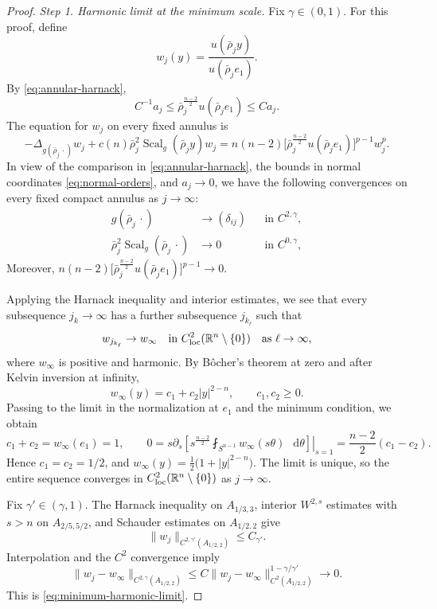 \documentclass[11pt]{article}
\numberwithin{equation}{section}
\theoremstyle{remark}
\newcommand{\R}{\mathbb R}
\newcommand{\Sph}{S}
\newcommand{\pa}{\partial}
\newcommand{\dd}{\mathop{}\!\mathrm{d}}
\begin{document}
\par
\begin{proof}
\emph{Step 1. Harmonic limit at the minimum scale.}
Fix \(\gamma\in(0,1)\).
{For this proof, define}
\[
 w_j(y)=\frac{u(\bar\rho_jy)}{u(\bar\rho_je_1)}.
\]
By \eqref{eq:annular-harnack},
\[
 C^{-1}a_j
 \le\bar\rho_j^{\frac{n-2}{2}}u(\bar\rho_je_1)
 \le Ca_j.
\]
The equation for \(w_j\) on every fixed annulus is
\[
 -\Delta_{g(\bar\rho_j\,\cdot)}w_j
 +c(n)\bar\rho_j^2\operatorname{Scal}_g(\bar\rho_jy)w_j
 =
 n(n-2)
 \bigl[\bar\rho_j^{\frac{n-2}{2}}u(\bar\rho_je_1)\bigr]^{p-1}w_j^p.
\]
{In view of the comparison in
\eqref{eq:annular-harnack}, the bounds in normal coordinates
\eqref{eq:normal-orders}, and \(a_j\to0\), we have the following
convergences on every fixed compact annulus as \(j\to\infty\):}
 {
\[
 \begin{aligned}
 g(\bar\rho_j\,\cdot)
 &\to(\delta_{ij})
 &&\text{in }C^{2,\gamma},\\
 \bar\rho_j^2\operatorname{Scal}_g(\bar\rho_j\,\cdot)
 &\to0
 &&\text{in }C^{0,\gamma},
 \end{aligned}
\]
}
Moreover, \(n(n-2)\bigl[\bar\rho_j^{\frac{n-2}{2}}u(\bar\rho_je_1)\bigr]^{p-1} \to 0\).

{Applying the Harnack inequality and interior estimates, we
see that every subsequence \(j_k\to\infty\) has a further subsequence
\(j_{k_\ell}\) such that}
\[
 w_{j_{k_\ell}}\to w_\infty
 \quad\text{in }C^2_{\rm loc}(\R^n\setminus\{0\})
 \quad\text{as }\ell\to\infty,
\]
where \(w_\infty\) is positive and harmonic.
{By B\^ocher's theorem at zero and after Kelvin inversion at
infinity,}
\[
 w_\infty(y)=c_1+c_2|y|^{2-n},\qquad c_1,c_2\ge0.
\]
{Passing to the limit in the normalization at \(e_1\) and the
minimum condition, we obtain}
\[
 c_1+c_2=w_\infty(e_1)=1, \qquad 
 0=\left.s\pa_s\left[
 s^{\frac{n-2}{2}}\fint_{\Sph^{n-1}}w_\infty(s\theta)\,\dd\theta
 \right]\right|_{s=1}
 =\frac{n-2}{2}(c_1-c_2).
\]
Hence \(c_1=c_2=1/2\), and \(w_\infty(y)=\frac12\bigl(1+|y|^{2-n}\bigr)\).
The limit is unique, so the entire sequence converges in
\(C^2_{\rm loc}(\R^n\setminus\{0\})\) as \(j\to\infty\).

{Fix \(\gamma'\in(\gamma,1)\). The Harnack inequality on
\(A_{1/3,3}\), interior \(W^{2,s}\) estimates with \(s>n\) on
\(A_{2/5,5/2}\), and Schauder estimates on \(A_{1/2,2}\) give}
\[
 \|w_j\|_{C^{2,\gamma'}(A_{1/2,2})}\le C_{\gamma'}.
\]
Interpolation and the \(C^2\) convergence imply
\[
 \|w_j-w_\infty\|_{C^{2,\gamma}(A_{1/2,2})}
 \le C\|w_j-w_\infty\|_{C^2(A_{1/2,2})}^{1-\gamma/\gamma'}
 \to0.
\]
This is \eqref{eq:minimum-harmonic-limit}.


\end{proof}
\end{document}
